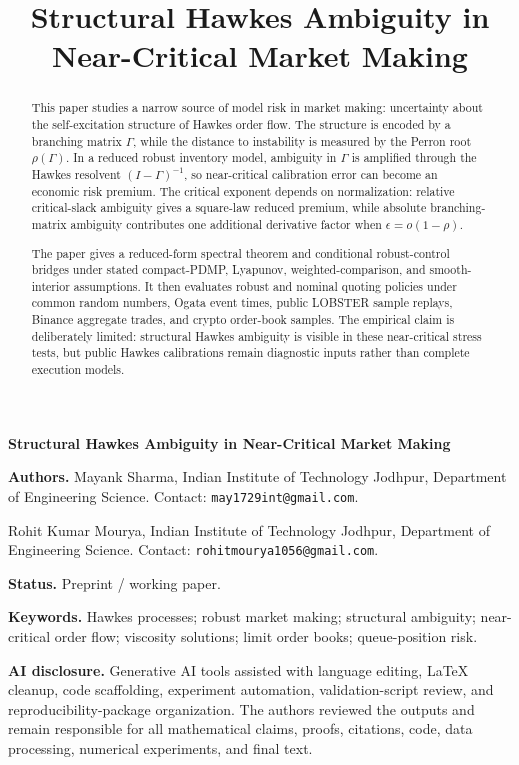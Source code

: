 \documentclass[11pt]{article}
\title{Structural Hawkes Ambiguity in Near-Critical Market Making}
\author{}
\date{}
\begin{document}
\begin{center}
{\LARGE\bfseries Structural Hawkes Ambiguity in Near-Critical Market Making\par}
\end{center}
\vspace{0.75em}

\begin{abstract}
This paper studies a narrow source of model risk in market making: uncertainty
about the self-excitation structure of Hawkes order flow. The structure is
encoded by a branching matrix $\Gamma$, while the distance to instability is
measured by the Perron root $\rho(\Gamma)$. In a reduced robust inventory model,
ambiguity in $\Gamma$ is amplified through the Hawkes resolvent
$(I-\Gamma)^{-1}$, so near-critical calibration error can become an economic
risk premium. The critical exponent depends on normalization: relative
critical-slack ambiguity gives a square-law reduced premium, while absolute
branching-matrix ambiguity contributes one additional derivative factor when
$\epsilon=o(1-\rho)$.

The paper gives a reduced-form spectral theorem and conditional robust-control
bridges under stated compact-PDMP, Lyapunov, weighted-comparison, and
smooth-interior assumptions. It then evaluates robust and nominal quoting
policies under common random numbers, Ogata event times, public LOBSTER sample
replays, Binance aggregate trades, and crypto order-book samples. The empirical
claim is deliberately limited: structural Hawkes ambiguity is visible in these
near-critical stress tests, but public Hawkes calibrations remain diagnostic
inputs rather than complete execution models.
\end{abstract}

\noindent\textbf{Authors.}
Mayank Sharma, Indian Institute of Technology Jodhpur, Department of
Engineering Science. Contact: \texttt{may1729int@gmail.com}.

Rohit Kumar Mourya, Indian Institute of Technology Jodhpur, Department of
Engineering Science. Contact: \texttt{rohitmourya1056@gmail.com}.

\medskip
\noindent\textbf{Status.}
Preprint / working paper.

\medskip
\noindent\textbf{Keywords.}
Hawkes processes; robust market making; structural ambiguity; near-critical
order flow; viscosity solutions; limit order books; queue-position risk.

\medskip
\noindent\textbf{AI disclosure.}
Generative AI tools assisted with language editing, LaTeX cleanup, code
scaffolding, experiment automation, validation-script review, and
reproducibility-package organization. The authors reviewed the outputs and
remain responsible for all mathematical claims, proofs, citations, code, data
processing, numerical experiments, and final text.
\end{document}
